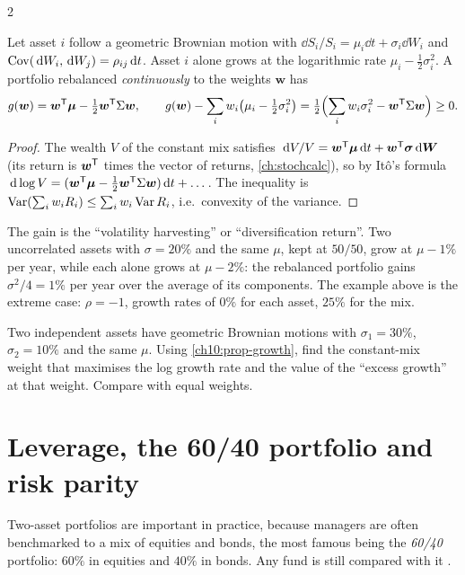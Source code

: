 \begin{paracol}{2}
\begin{proposition}\label{ch10:prop-growth}
Let asset $i$ follow a geometric Brownian motion with $\dd S_i/S_i=\mu_i\dd t+\sigma_i\dd W_i$ and
$\operatorname{Cov}(\,\mathrm{d} W_i,\,\mathrm{d} W_j)=\rho_{ij}\,\mathrm{d} t$. Asset $i$ alone grows at the logarithmic rate $\mu_i-\frac12\sigma_i^2$.
A portfolio rebalanced \emph{continuously} to the weights $\bm w$ has
\begin{equation}\label{ch10:eq-growth}
  g(\bm w)=\bm w^{\mathsf T}\bm\mu-\tfrac12\bm w^{\mathsf T}\Sigma\bm w,\qquad
  g(\bm w)-\sum_iw_i\bigl(\mu_i-\tfrac12\sigma_i^2\bigr)=\tfrac12\Bigl(\sum_iw_i\sigma_i^2-\bm w^{\mathsf T}\Sigma\bm w\Bigr)\ge0 .
\end{equation}
\end{proposition}
\begin{proof}
The wealth $V$ of the constant mix satisfies $\,\mathrm{d} V/V=\bm w^{\mathsf T}\bm\mu\,\mathrm{d} t+\bm w^{\mathsf T}\bm\sigma\,\mathrm{d}\bm W$ (its return is
$\bm w^{\mathsf T}$ times the vector of returns, \cref{ch:stochcalc}), so by It\^o's formula
$\,\mathrm{d}\log V=(\bm w^{\mathsf T}\bm\mu-\tfrac12\bm w^{\mathsf T}\Sigma\bm w)\,\mathrm{d} t+\dots$. The inequality is $\operatorname{Var}(\sum_iw_iR_i)\le\sum_iw_i\operatorname{Var} R_i$,
i.e.\ convexity of the variance.
\end{proof}
The gain is the ``volatility harvesting'' or ``diversification return''. Two uncorrelated assets with $\sigma=20\%$
and the same $\mu$, kept at $50/50$, grow at $\mu-1\%$ per year, while each alone grows at $\mu-2\%$: the
rebalanced portfolio gains $\sigma^2/4=1\%$ per year over the average of its components. The example above is the
extreme case: $\rho=-1$, growth rates of $0\%$ for each asset, $25\%$ for the mix.

\begin{exercise}
Two independent assets have geometric Brownian motions with $\sigma_1=30\%$, $\sigma_2=10\%$ and the same $\mu$. Using
\cref{ch10:prop-growth}, find the constant-mix weight that maximises the log growth rate and the value of the ``excess growth'' at
that weight. Compare with equal weights.
\end{exercise}

\section{Leverage, the 60/40 portfolio and risk parity}\label{ch10:sec-rp}

Two-asset portfolios are important in practice, because managers are often benchmarked to a mix of equities and
bonds, the most famous being the \emph{60/40} portfolio: $60\%$ in equities and $40\%$ in bonds. Any fund is still
compared with it .


\end{paracol}
